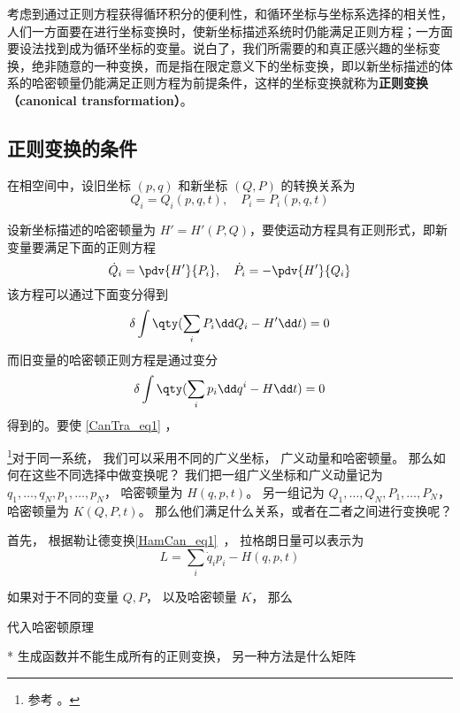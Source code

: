 考虑到通过正则方程获得循环积分的便利性，和循环坐标与坐标系选择的相关性，人们一方面要在进行坐标变换时，使新坐标描述系统时仍能满足正则方程；一方面要设法找到成为循环坐标的变量。说白了，我们所需要的和真正感兴趣的坐标变换，绝非随意的一种变换，而是指在限定意义下的坐标变换，即以新坐标描述的体系的哈密顿量仍能满足正则方程为前提条件，这样的坐标变换就称为\textbf{正则变换（canonical transformation）}。

\subsection{正则变换的条件}
在相空间中，设旧坐标 $(p,q)$ 和新坐标 $(Q,P)$ 的转换关系为
\begin{equation}
Q_i=Q_i(p,q,t),\quad P_i=P_i(p,q,t)
\end{equation}

设新坐标描述的哈密顿量为 $H'=H'(P,Q)$，要使运动方程具有正则形式，即新变量要满足下面的正则方程
\begin{equation}
\dot Q_i=\pdv{H'}{P_i},\quad \dot P_i=-\pdv{H'}{Q_i}
\end{equation}
该方程可以通过下面变分得到
\begin{equation}\label{CanTra_eq1}
\delta\int\qty(\sum_iP_i\dd Q_i-H'\dd t)=0
\end{equation}
而旧变量的哈密顿正则方程是通过变分
\begin{equation}
\delta\int\qty(\sum_ip_i\dd q^i-H\dd t)=0
\end{equation}
得到的。要使 \autoref{CanTra_eq1} ，




\footnote{参考 \cite{Goldstein}。}对于同一系统， 我们可以采用不同的广义坐标， 广义动量和哈密顿量。 那么如何在这些不同选择中做变换呢？ 我们把一组广义坐标和广义动量记为 $q_1,\dots, q_N, p_1, \dots, p_N$， 哈密顿量为 $H(q, p, t)$。 另一组记为 $Q_1,\dots, Q_N, P_1, \dots, P_N$， 哈密顿量为 $K(Q, P, t)$。 那么他们满足什么关系，或者在二者之间进行变换呢？

首先， 根据勒让德变换\autoref{HamCan_eq1}~， 拉格朗日量可以表示为
\begin{equation}
L = \sum_i \dot q_i p_i - H(q, p, t)
\end{equation}

如果对于不同的变量 $Q, P$， 以及哈密顿量 $K$， 那么

代入哈密顿原理

* 生成函数并不能生成所有的正则变换， 另一种方法是什么矩阵

